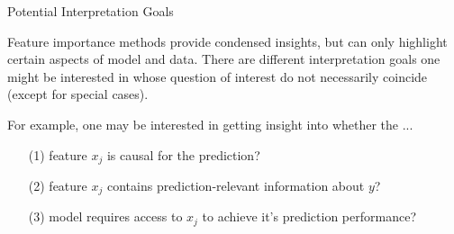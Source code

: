 \documentclass[11pt,compress,t,notes=noshow, aspectratio=169, xcolor=table]{beamer}
\begin{document}
\begin{frame}{Potential Interpretation Goals}

Feature importance methods provide condensed insights, but can only highlight certain aspects of model and data. There are different interpretation goals one might be interested in whose question of interest do not necessarily coincide (except for special cases).

\lz

For example, one may be interested in getting insight into whether the ...

\begin{enumerate}
    \item[(1)] feature $x_j$ is causal for the prediction?
    \item[(2)] feature $x_j$ contains prediction-relevant information about $y$?
    \item[(3)] model requires access to $x_j$ to achieve it's prediction performance?
\end{enumerate}
\end{frame}
\end{document}
